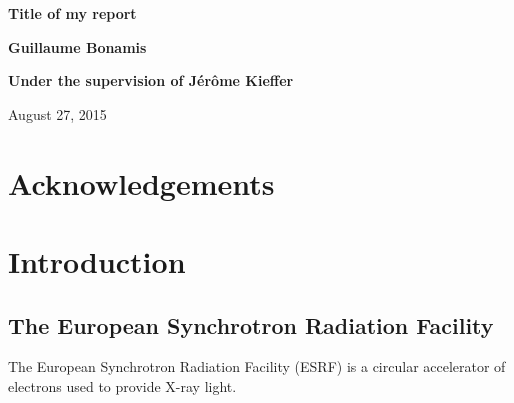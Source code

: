 \documentclass[a4paper, 11pt]{report}
\begin{document}
\begin{titlepage}
    \parindent=0pt
    \hrulefill
    \begin{center}\bfseries\Huge            %
        Title of my report                  %
    \end{center}

    \hrulefill
    \vspace*{1cm}
    \begin{center}\bfseries\Large           %
        Guillaume Bonamis
    \end{center}

    \begin{center}\bfseries\Large           %
        Under the supervision of J\'er\^ome Kieffer
    \end{center}

    \begin{flushright}
        August 27, 2015
    \end{flushright}   
    
\end{titlepage}


\tableofcontents
{}

\chapter*{Acknowledgements}



\chapter{Introduction}


\section{The European Synchrotron Radiation Facility}

The European Synchrotron Radiation Facility (ESRF) is a circular 
accelerator of electrons used to provide X-ray light.\\
\end{document}
